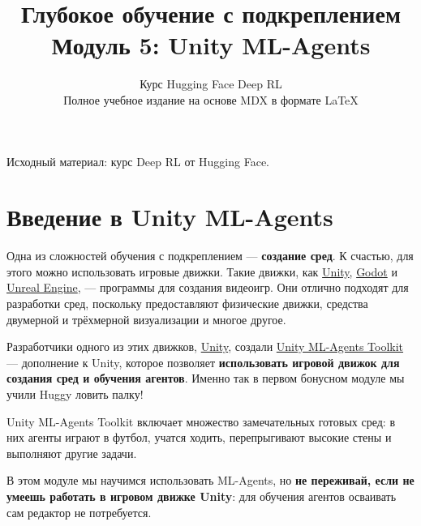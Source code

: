\documentclass[11pt,a4paper]{article}
\title{\textbf{Глубокое обучение с подкреплением}\\[0.35em]\large Модуль 5: Unity ML-Agents}
\author{Курс Hugging Face Deep RL\\\small Полное учебное издание на основе MDX в формате \LaTeX{}}
\date{}
\begin{document}
\selectfont
\maketitle
\vspace{-0.8em}
\begin{center}\small\color{secondary}Исходный материал: курс Deep RL от Hugging Face.\end{center}
\begingroup\small\setlength{\parskip}{0pt}\tableofcontents\endgroup
\vspace{0.5em}
\clearpage

\section{Введение в Unity ML-Agents}\label{an-introduction-to-unity-ml-agents}


Одна из сложностей обучения с подкреплением --- \textbf{создание сред}. К счастью, для этого можно использовать игровые движки. Такие движки, как \href{https://unity.com/}{Unity}, \href{https://godotengine.org/}{Godot} и \href{https://www.unrealengine.com/}{Unreal Engine}, --- программы для создания видеоигр. Они отлично подходят для разработки сред, поскольку предоставляют физические движки, средства двумерной и трёхмерной визуализации и многое другое.

Разработчики одного из этих движков, \href{https://unity.com/}{Unity}, создали \href{https://github.com/Unity-Technologies/ml-agents}{Unity ML-Agents Toolkit} --- дополнение к Unity, которое позволяет \textbf{использовать игровой движок для создания сред и обучения агентов}. Именно так в первом бонусном модуле мы учили Huggy ловить палку!


Unity ML-Agents Toolkit включает множество замечательных готовых сред: в них агенты играют в футбол, учатся ходить, перепрыгивают высокие стены и выполняют другие задачи.

В этом модуле мы научимся использовать ML-Agents, но \textbf{не переживай, если не умеешь работать в игровом движке Unity}: для обучения агентов осваивать сам редактор не потребуется.
\end{document}
